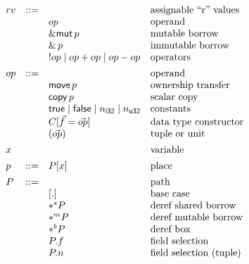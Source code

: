 \documentclass[acmsmall,screen]{acmart}
\newif\iflong
\newif\ifshort
\newcommand\kw[1]{\ensuremath{\mathsf{#1}}}
\newcommand\ebrw[1]{\ensuremath{\mathsf{\&}\,#1}}
\newcommand\embrw[1]{\ensuremath{\mathsf{\&mut}\,#1}}
\newcommand\ederefs[1]{\ensuremath{*^s#1}}
\newcommand\ederefm[1]{\ensuremath{*^m#1}}
\newcommand\ederefb[1]{\ensuremath{*^b#1}}
\newcommand\emove[1]{\ensuremath{\kw{move}\,#1}}
\newcommand\ecopy[1]{\ensuremath{\kw{copy}\,#1}}
\newcommand\kop{\ensuremath{op}}
\newcommand\kfalse{\mathsf{false}}
\newcommand\ktrue{\mathsf{true}}
\begin{document}
\begin{figure}
\[\begin{array}{ll}
\begin{array}[t]{llll}
      rv & ::= & & \text{assignable ``r'' values} \\
      && \kop & \text{operand} \\
      && \embrw p & \text{mutable borrow} \\
      && \ebrw p & \text{immutable \iflong(shared) \fi borrow} \\
      && !\kop \mid \kop + \kop \mid \kop - \kop \iflong\mid \ldots\fi & \text{operators}
      \\[1ex]

    \ifshort
    \end{array} & %
    \begin{array}[t]{llll} %
    \fi

      \kop & ::= & & \text{operand} \\
      && \emove p & \text{ownership transfer} \\
      && \ecopy p & \text{scalar copy} \\
      && \ktrue \mid \kfalse \mid n_{\mathsf{i32}} \mid n_{\mathsf{u32}} \iflong\mid \ldots\fi & \text{constants} \\
      && C [\vec f = \vec{\kop}] & \text{data type constructor} \\
      && (\vec{op}) & \text{tuple \iflong($\kw{len}(\vec{op}) > 1$)\fi or unit \iflong($\kw{len}(\vec{op}) = 0$)\fi}
      \\[1ex]

      x & & & \text{variable}
      \\[1ex]

      p & ::= & P[x] & \text{place}
      \\[1ex]

      P & ::= & & \text{path} \\
      && [.] & \text{base case} \\
      && \ederefs P & \text{deref shared borrow} \\
      && \ederefm P & \text{deref mutable borrow} \\
      && \ederefb P & \text{deref box} \\
      && P.f & \text{field selection} \\
      && P.n & \text{field selection (tuple)}
      \\[1ex]


\end{array}
\end{array}\]
\end{figure}
\end{document}

